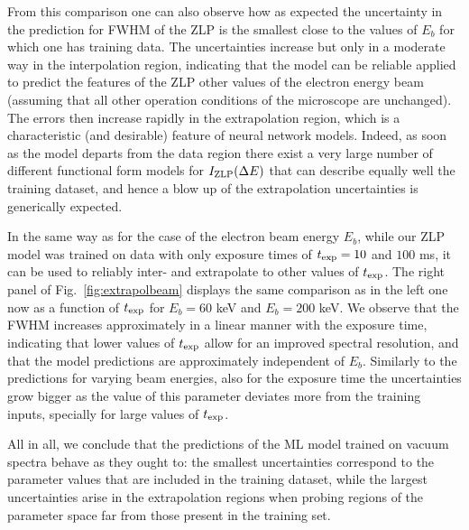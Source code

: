 From this comparison one can also observe how as expected the uncertainty in the  prediction for FWHM
of the ZLP is the smallest close to the values of $E_b$ for which one has training data.
%
The uncertainties increase but only in a moderate way in the interpolation region, indicating that
the model can be reliable applied to predict the features of the ZLP other values of the electron
energy beam (assuming that all other operation conditions of the microscope are unchanged).
%
The errors then increase rapidly in the extrapolation region, which is a characteristic
(and desirable) feature of  neural network models.
%
Indeed, as soon as the model departs from the data region there exist a very large
number of different functional form models for $I_{\rm ZLP}(\Delta E)$ that can describe equally well
the training dataset, and hence a blow up of the extrapolation uncertainties is generically expected.


In the same way as for the case of the electron beam energy $E_b$, while our ZLP model
was trained on data with only exposure times of $t_{\rm exp}=10$ and $100$ ms,
it can be used to reliably inter- and extrapolate to other values of $t_{\rm exp}$.
%
The right panel of Fig.~\ref{fig:extrapolbeam} displays the same
comparison as in the left one now as a function of $t_{\rm exp}$ for
$E_b=60$ keV and $E_b=200$ keV.
%
We observe that the FWHM increases approximately in a linear manner with the exposure time, indicating
that lower values of $t_{\rm exp}$ allow for an improved spectral resolution, and that the model
predictions are approximately independent of $E_b$.
%
Similarly to the predictions for varying beam energies, also for the exposure time the uncertainties grow bigger as the value of this parameter deviates more from the training inputs,
specially for large values of $t_{\rm exp}$.

All in all, we conclude that the predictions of the ML model trained on vacuum spectra
behave as they ought to: the smallest uncertainties correspond to the parameter values
that are included in the training dataset, while the largest uncertainties arise
in the extrapolation regions when probing regions of the parameter space far from those
present in the training set.


